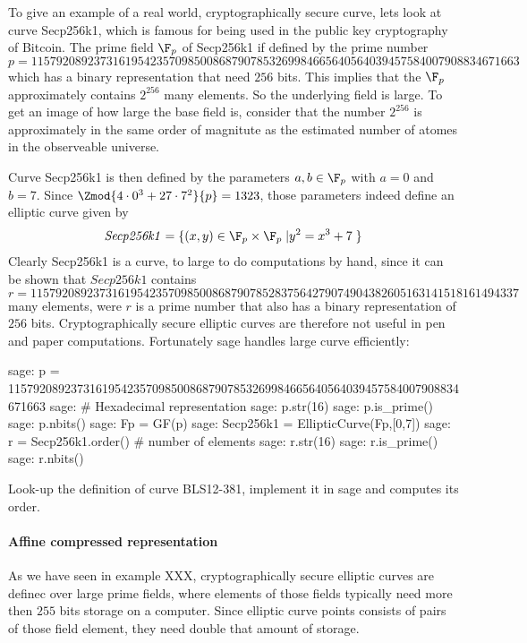 \begin{example}To give an example of a real world, cryptographically secure curve, lets look at curve Secp256k1, which is famous for being used in the public key cryptography of Bitcoin. The prime field $\F_p$ of Secp256k1 if defined by the prime number
$$
p = \scriptstyle 115792089237316195423570985008687907853269984665640564039457584007908834671663
$$
which has a binary representation that need $256$ bits. This implies that the $\F_p$ approximately contains $2^{256}$ many elements. So the underlying field is large. To get an image of how large the base field is, consider that the number $2^{256}$ is approximately in the same order of magnitute as the estimated number of atomes in the observeable universe. 

Curve Secp256k1 is then defined by the parameters $a,b\in \F_p$ with $a=0$ and $b=7$. Since $\Zmod{4\cdot 0^3 + 27\cdot 7^2}{p}=1323$, those parameters indeed define an elliptic curve given by
$$
\mathit{Secp256k1} = \{(x,y)\in \F_p\times \F_p\;| y^2 = x^3 +7\;\} 
$$
Clearly Secp256k1 is a curve, to large to do computations by hand, since it can be shown that $\mathit{Secp256k1}$ contains 
$$
r = \scriptstyle 11579208923731619542357098500868790785283756427907490438260516
3141518161494337
$$
many elements, were $r$ is a prime number that also has a binary representation of $256$ bits. Cryptographically secure elliptic curves are therefore not useful in pen and paper computations. Fortunately sage handles large curve efficiently:
\begin{sagecommandline}
sage: p = 115792089237316195423570985008687907853269984665640564039457584007908834671663
sage: # Hexadecimal representation
sage: p.str(16)
sage: p.is_prime()
sage: p.nbits()
sage: Fp = GF(p)
sage: Secp256k1 = EllipticCurve(Fp,[0,7])
sage: r = Secp256k1.order() # number of elements
sage: r.str(16)
sage: r.is_prime()
sage: r.nbits()
\end{sagecommandline}
\end{example}
\begin{exercise}
Look-up the definition of curve BLS12-381, implement it in sage and computes its order.
\end{exercise}
\paragraph{Affine compressed representation} As we have seen in example XXX, cryptographically secure elliptic curves are definec over large prime fields, where elements of those fields typically need more then $255$ bits storage on a computer. Since elliptic curve points consists of pairs of those field element, they need double that amount of storage.

